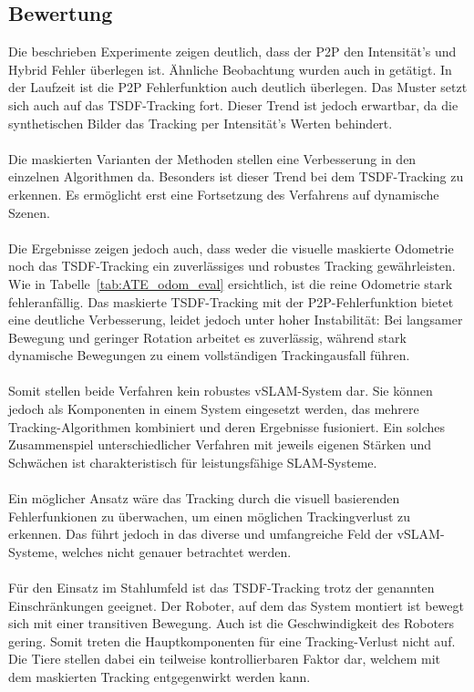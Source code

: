 \documentclass[12pt,DIV=15,BCOR=15mm,twoside,headsepline,abstract=true,listof=totoc,bibliography=totoc]{scrreprt}
\theoremstyle{remark}    %
\begin{document}
    \subsection{Bewertung}
    Die beschrieben Experimente zeigen deutlich, dass der \ac{P2P} den Intensität's und Hybrid Fehler überlegen ist. Ähnliche Beobachtung wurden auch in 
    \cite{rusinkiewicz2001efficient} getätigt.
    In der Laufzeit ist die \ac{P2P} Fehlerfunktion auch deutlich überlegen. 
    Das Muster setzt sich auch auf das \ac{TSDF}-Tracking fort. Dieser Trend ist jedoch erwartbar, da die synthetischen Bilder das Tracking per Intensität's Werten 
    behindert.\\\\
    Die  maskierten Varianten der Methoden stellen eine Verbesserung in den einzelnen Algorithmen da. Besonders ist dieser Trend bei dem \ac{TSDF}-Tracking
    zu erkennen. Es ermöglicht erst eine Fortsetzung des Verfahrens auf dynamische Szenen.\\\\
    Die Ergebnisse zeigen jedoch auch, dass weder die visuelle maskierte Odometrie noch das \ac{TSDF}-Tracking ein zuverlässiges und robustes Tracking gewährleisten.
    Wie in Tabelle~\ref{tab:ATE_odom_eval} ersichtlich, ist die reine Odometrie stark fehleranfällig.
    Das maskierte \ac{TSDF}-Tracking mit der \ac{P2P}-Fehlerfunktion bietet eine deutliche Verbesserung, leidet jedoch unter hoher Instabilität:
    Bei langsamer Bewegung und geringer Rotation arbeitet es zuverlässig, während stark dynamische Bewegungen zu einem vollständigen Trackingausfall führen.\\\\ 
    Somit stellen beide Verfahren kein robustes \ac{vSLAM}-System dar.
    Sie können jedoch als Komponenten in einem System eingesetzt werden, das mehrere Tracking-Algorithmen kombiniert und deren Ergebnisse fusioniert.
    Ein solches Zusammenspiel unterschiedlicher Verfahren mit jeweils eigenen Stärken und Schwächen ist charakteristisch für leistungsfähige \ac{SLAM}-Systeme.\\\\
    Ein möglicher Ansatz wäre das Tracking durch die visuell basierenden Fehlerfunkionen zu überwachen, um einen möglichen Trackingverlust zu erkennen.
    Das führt jedoch in das diverse und umfangreiche Feld der vSLAM-Systeme, welches nicht genauer betrachtet werden.\\\\
    Für den Einsatz im Stahlumfeld ist das \ac{TSDF}-Tracking trotz der genannten Einschränkungen geeignet. Der Roboter, auf dem das System montiert ist bewegt 
    sich mit einer transitiven Bewegung. Auch ist die Geschwindigkeit des Roboters gering. Somit treten die Hauptkomponenten für eine Tracking-Verlust 
    nicht auf. Die Tiere stellen dabei ein teilweise kontrollierbaren Faktor dar, welchem mit dem maskierten Tracking entgegenwirkt werden kann.
\end{document}

